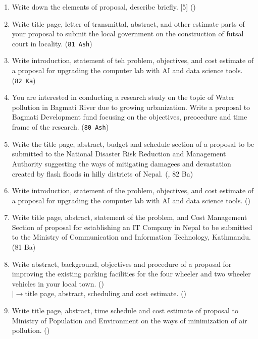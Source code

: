 \documentclass[12pt]{article}
\newcommand{\lb}{\\$\left|\rightarrow\right.$}
\begin{document}
  \begin{enumerate}
    \item Write down the elements of proposal, describe briefly. \hfill [5] ()

    \item Write title page, letter of transmittal, abstract, and other estimate parts of your proposal to submit the local government on the construction of futsal court in locality. \hfill (\texttt{81 Ash})

    \item Write introduction, statement of teh problem, objectives, and cost estimate of a proposal for upgrading the computer lab with AI and data science tools. \hfill (\texttt{82 Ka})

    \item You are interested in conducting a research study on the topic of Water pollution in Bagmati River due to growing urbanization. Write a proposal to Bagmati Development fund focusing on the objectives, preocedure and time frame of the research. \hfill (\texttt{80 Ash})

    \item Write the title page, abstract, budget and schedule section of a proposal to be submitted to the National Disaster Risk Reduction and Management Authority suggesting the ways of mitigating damagees and devastation created by flash floods in hilly districts of Nepal. \hfill (, 82 Ba)

    \item Write introduction, statement of the problem, objectives, and cost estimate of a proposal for upgrading the computer lab with AI and data science tools. \hfill ()

    \item Write title page, abstract, statement of the problem, and Cost Management Section of proposal for establishing an IT Company in Nepal to be submitted to the Ministry of Communication and Information Technology, Kathmandu. \hfill (81 Ba)

    \item Write abstract, background, objectives and procedure of a proposal for improving the existing parking facilities for the four wheeler and two wheeler vehicles in your local town. \hfill ()
      \lb title page, abstract, scheduling and cost estimate. \hfill ()

    \item Write title page, abstract, time schedule and cost estimate of proposal to Ministry of Population and Environment on the ways of minimization of air pollution. \hfill ()


\end{enumerate}
\end{document}
